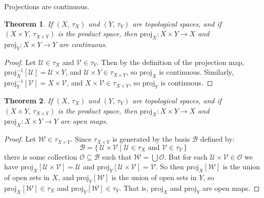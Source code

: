 \documentclass{article}
\theoremstyle{plain}
\newtheorem{theorem}{Theorem}[section]
\theoremstyle{normal}
\begin{document}
        Projections are continuous.
        \begin{theorem}
            If $(X,\,\tau_{X})$ and $(Y,\,\tau_{Y})$ are topological spaces,
            and if $(X\times{Y},\,\tau_{X\times{Y}})$ is the product space,
            then $\textrm{proj}_{X}:X\times{Y}\rightarrow{X}$ and
            $\textrm{proj}_{Y}:X\times{Y}\rightarrow{Y}$ are continuous.
        \end{theorem}
        \begin{proof}
            Let $\mathcal{U}\in\tau_{X}$ and $\mathcal{V}\in\tau_{Y}$. Then by
            the definition of the projection map,
            $\textrm{proj}_{X}^{-1}[\mathcal{U}]=\mathcal{U}\times{Y}$, and
            $\mathcal{U}\times{Y}\in\tau_{X\times{Y}}$, so
            $\textrm{proj}_{X}$ is continuous. Similarly,
            $\textrm{proj}_{Y}^{-1}[\mathcal{V}]=X\times\mathcal{V}$, and
            $X\times\mathcal{V}\in\tau_{X\times{Y}}$, so
            $\textrm{proj}_{Y}$ is continuous.
        \end{proof}
        \begin{theorem}
            If $(X,\,\tau_{X})$ and $(Y,\,\tau_{Y})$ are topological spaces,
            and if $(X\times{Y},\,\tau_{X\times{Y}})$ is the product space,
            then $\textrm{proj}_{X}:X\times{Y}\rightarrow{X}$ and
            $\textrm{proj}_{X}:X\times{Y}\rightarrow{Y}$ are open maps.
        \end{theorem}
        \begin{proof}
            Let $\mathcal{W}\in\tau_{X\times{Y}}$. Since $\tau_{X\times{Y}}$
            is generated by the basis $\mathcal{B}$ defined by:
            \begin{equation}
                \mathcal{B}=\{\,
                    \mathcal{U}\times\mathcal{V}\;|\;
                    \mathcal{U}\in\tau_{X}\textrm{ and }
                    \mathcal{V}\in\tau_{Y}\,\}
            \end{equation}
            there is some collection $\mathcal{O}\subseteq\mathcal{B}$ such
            that $\mathcal{W}=\bigcup\mathcal{O}$. But for each
            $\mathcal{U}\times\mathcal{V}\in\mathcal{O}$ we have
            $\textrm{proj}_{X}[\mathcal{U}\times\mathcal{V}]=\mathcal{U}$ and
            $\textrm{proj}_{Y}[\mathcal{U}\times\mathcal{V}]=\mathcal{V}$.
            So then $\textrm{proj}_{X}[\mathcal{W}]$ is the union of open sets
            in $X$, and $\textrm{proj}_{Y}[\mathcal{W}]$ is the union of open
            sets in $Y$, so $\textrm{proj}_{X}[\mathcal{W}]\in\tau_{X}$ and
            $\textrm{proj}_{Y}[\mathcal{W}]\in\tau_{Y}$. That is,
            $\textrm{proj}_{X}$ and $\textrm{proj}_{Y}$ are open maps.
        \end{proof}
\end{document}
